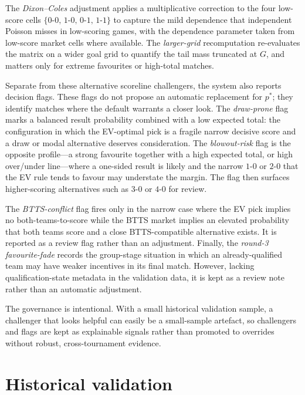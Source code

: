 \documentclass[11pt]{article}
\begin{document}
The \emph{Dixon--Coles} adjustment \cite{dixoncoles1997} applies a multiplicative
correction to the four low-score cells
$\{0\text{-}0,\,1\text{-}0,\,0\text{-}1,\,1\text{-}1\}$ to capture the mild dependence that
independent Poisson misses in low-scoring games, with the dependence parameter taken from
low-score market cells where available. The \emph{larger-grid} recomputation re-evaluates
the matrix on a wider goal grid to quantify the tail mass truncated at $G$, and matters
only for extreme favourites or high-total matches.

Separate from these alternative scoreline challengers, the system also reports decision
flags. These flags do not propose an automatic replacement for $p^{*}$; they identify
matches where the default warrants a closer look. The \emph{draw-prone} flag marks a
balanced result probability combined with a low expected total: the configuration in which
the EV-optimal pick is a fragile narrow decisive score and a draw or modal alternative
deserves consideration. The \emph{blowout-risk} flag is the opposite profile---a strong
favourite together with a high expected total, or high over/under line---where a one-sided
result is likely and the narrow $1\text{-}0$ or $2\text{-}0$ that the EV rule tends to
favour may understate the margin. The flag then surfaces higher-scoring alternatives such
as $3\text{-}0$ or $4\text{-}0$ for review.

\clearpage
The \emph{BTTS-conflict} flag fires only in the narrow case where the EV pick implies no
both-teams-to-score while the BTTS market implies an elevated probability that both teams
score and a close BTTS-compatible alternative exists. It is reported as a review flag rather
than an adjustment. Finally, the \emph{round-3 favourite-fade} records the group-stage situation in
which an already-qualified team may have weaker incentives in its final match. However,
lacking qualification-state metadata in the validation data, it is kept as a review note
rather than an automatic adjustment.

The governance is intentional. With a small historical validation sample, a challenger that
looks helpful can easily be a small-sample artefact, so challengers and flags are kept as
explainable signals rather than promoted to overrides without robust, cross-tournament
evidence.


\section{Historical validation}
\label{sec:validation}
\end{document}

